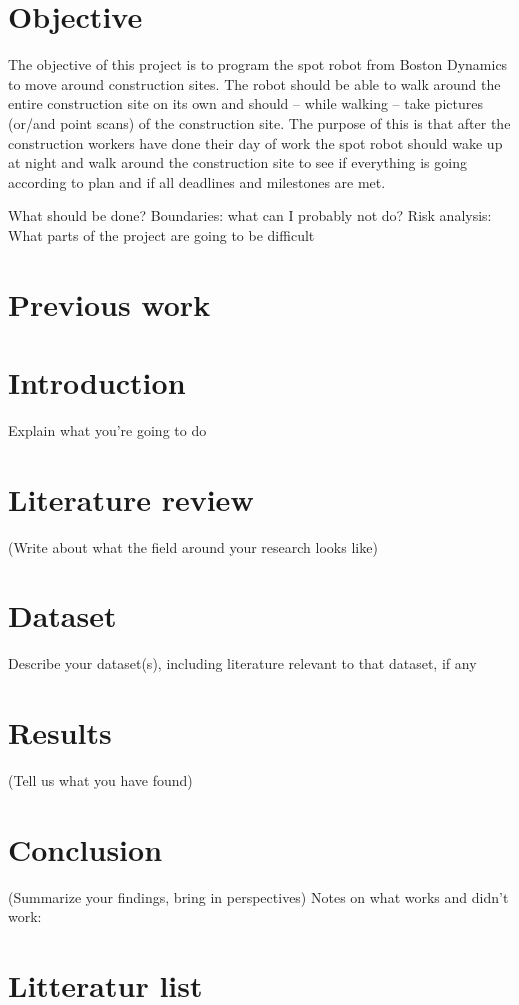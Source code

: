 \section*{Objective}
The objective of this project is to program the spot robot from Boston Dynamics
to move around construction sites. The robot should be able to walk around the entire construction site on its own and should – while walking – take pictures (or/and point scans) of the construction site. The purpose of this is that after the construction workers have done their day of work the spot robot should wake up at night and walk around the construction site to see if everything is going according to plan and if all deadlines and milestones are met.

What should be done?
Boundaries: what can I probably not do?
Risk analysis: What parts of the project are going to be difficult



\section*{Previous work}

\section*{Introduction}
Explain what you’re going to do

\section*{Literature review}
(Write about what the field around your research looks like)

\section*{Dataset}
Describe your dataset(s), including literature relevant to that dataset, if any

\section*{Results}
(Tell us what you have found)

\section*{Conclusion}
(Summarize your findings, bring in perspectives)
Notes on what works and didn’t work:

\section*{Litteratur list}




